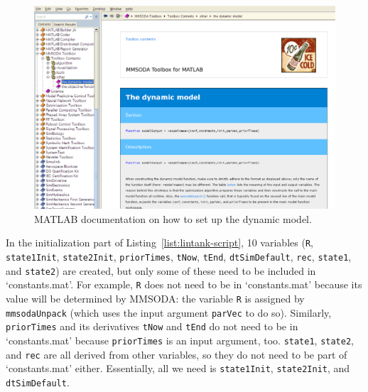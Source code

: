 \begin{figure}[htb]
  \centering
    \includegraphics[width=\linewidth,keepaspectratio]{./../eps/doc-the-dynamic-model.eps}
  \caption{MATLAB documentation on how to set up the dynamic model.}
  \label{fig:doc-the-dynamic-model}
\end{figure}

In the initialization part of Listing~\ref{list:lintank-script}, 10 variables (\texttt{R}, \texttt{state1Init}, \texttt{state2Init}, \texttt{priorTimes}, \texttt{tNow}, \texttt{tEnd}, \texttt{dtSimDefault}, \texttt{rec}, \texttt{state1}, and \texttt{state2}) are created, but only some of these need to be included in `constants.mat'. For example, \texttt{R} does not need to be in `constants.mat' because its value will be determined by MMSODA: the variable \texttt{R} is assigned by \texttt{mmsodaUnpack} (which uses the input argument \texttt{parVec} to do so). Similarly, \texttt{priorTimes} and its derivatives \texttt{tNow} and \texttt{tEnd} do not need to be in `constants.mat' because \texttt{priorTimes} is an input argument, too. \texttt{state1}, \texttt{state2}, and \texttt{rec} are all derived from other variables, so they do not need to be part of `constants.mat' either. Essentially, all we need is \texttt{state1Init}, \texttt{state2Init}, and \texttt{dtSimDefault}.


